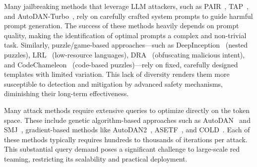 Many jailbreaking methods that leverage LLM attackers, such as PAIR~\citep{chao_jailbreaking_2024}, TAP~\citep{mehrotra_tree_2024}, and AutoDAN-Turbo~\citep{liu_autodan-turbo_2024}, rely on carefully crafted system prompts to guide harmful prompt generation. The success of these methods heavily depends on prompt quality, making the identification of optimal prompts a complex and non-trivial task. Similarly, puzzle/game-based approaches—such as DeepInception~\citep{li_deepinception_2024} (nested puzzles), LRL~\citep{yong_low-resource_2024} (low-resource languages), DRA~\citep{liu_making_2024} (obfuscating malicious intent), and CodeChameleon~\citep{lv_codechameleon_2024} (code-based puzzles)—rely on fixed, carefully designed templates with limited variation. This lack of diversity renders them more susceptible to detection and mitigation by advanced safety mechanisms, diminishing their long-term effectiveness.




 Many attack methods require extensive queries to optimize directly on the token space. These include genetic algorithm-based approaches such as AutoDAN~\citep{liu_autodan_2024} and SMJ~\citep{li_semantic_2024}, gradient-based methods like AutoDAN2~\citep{zhu_autodan_2023}, ASETF~\citep{wang_asetf_2024}, and COLD~\citep{guo_cold-attack_2024}. Each of these methods typically requires hundreds to thousands of iterations per attack. This substantial query demand poses a significant challenge to large-scale red teaming, restricting its scalability and practical deployment.

